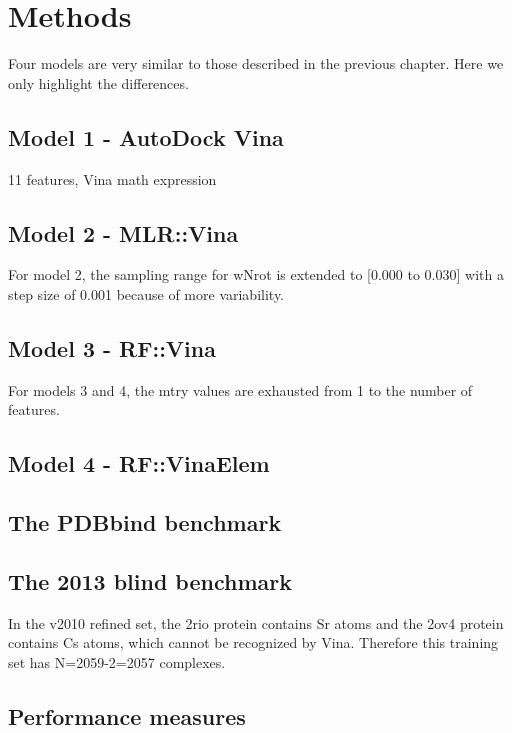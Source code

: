 \section{Methods}

Four models are very similar to those described in the previous chapter. Here we only highlight the differences.

\subsection{Model 1 - AutoDock Vina}

11 features, Vina math expression

\subsection{Model 2 - MLR::Vina}

For model 2, the sampling range for wNrot is extended to [0.000 to 0.030] with a step size of 0.001 because of more variability.

\subsection{Model 3 - RF::Vina}

For models 3 and 4, the mtry values are exhausted from 1 to the number of features.

\subsection{Model 4 - RF::VinaElem}

\subsection{The PDBbind benchmark}

\subsection{The 2013 blind benchmark}

In the v2010 refined set, the 2rio protein contains Sr atoms and the 2ov4 protein contains Cs atoms, which cannot be recognized by Vina. Therefore this training set has N=2059-2=2057 complexes.

\subsection{Performance measures}


